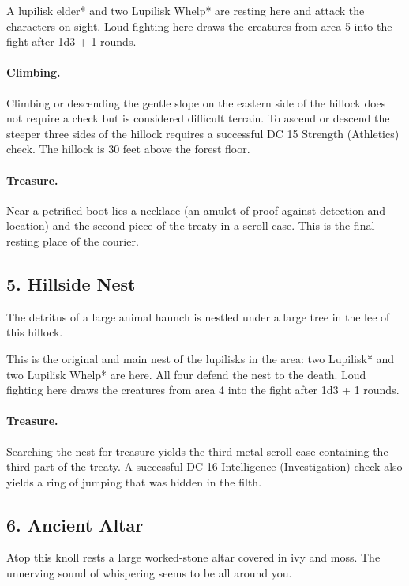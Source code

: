 \documentclass[10pt,a4paper,twoside,twocolumn,openany,bg=print,nodeprecatedcode]{dndbook}
\begin{document}
A lupilisk elder* and two Lupilisk Whelp* are resting here and attack the characters on sight. Loud fighting here draws the creatures from area 5 into the fight after 1d3 + 1 rounds.
\paragraph{Climbing.}
Climbing or descending the gentle slope on the eastern side of the hillock does not require a check but is considered difficult terrain. To ascend or descend the steeper three sides of the hillock requires a successful DC 15 Strength (Athletics) check. The hillock is 30 feet above the forest floor.
\paragraph{Treasure.}
Near a petrified boot lies a necklace (an amulet of proof against detection and location) and the second piece of the treaty in a scroll case. This is the final resting place of the courier.
\subsection{5. Hillside Nest}
\begin{DndReadAloud}{}
The detritus of a large animal haunch is nestled under a large tree in the lee of this hillock.
\end{DndReadAloud}

This is the original and main nest of the lupilisks in the area: two Lupilisk* and two Lupilisk Whelp* are here. All four defend the nest to the death. Loud fighting here draws the creatures from area 4 into the fight after 1d3 + 1 rounds.
\paragraph{Treasure.}
Searching the nest for treasure yields the third metal scroll case containing the third part of the treaty. A successful DC 16 Intelligence (Investigation) check also yields a ring of jumping that was hidden in the filth.
\subsection{6. Ancient Altar}
\begin{DndReadAloud}{}
Atop this knoll rests a large worked-stone altar covered in ivy and moss. The unnerving sound of whispering seems to be all around you.
\end{DndReadAloud}
\end{document}
